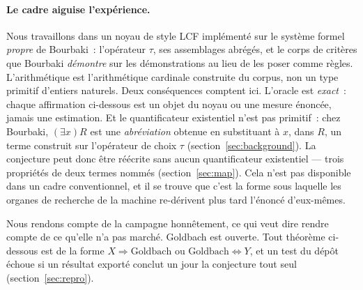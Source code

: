 \documentclass[11pt]{article}
\theoremstyle{remark}\newtheorem{remarque}{Remarque}
\begin{document}
\paragraph{Le cadre aiguise l'expérience.} Nous travaillons dans un noyau de style LCF
implémenté sur le système formel \emph{propre} de Bourbaki~: l'opérateur $\tau$, ses
assemblages abrégés, et le corps de critères que Bourbaki \emph{démontre} sur les
démonstrations au lieu de les poser comme règles. L'arithmétique est l'arithmétique
cardinale construite du corpus, non un type primitif d'entiers naturels. Deux
conséquences comptent ici. L'oracle est \emph{exact}~: chaque affirmation ci-dessous est
un objet du noyau ou une mesure énoncée, jamais une estimation. Et le quantificateur
existentiel n'est pas primitif~: chez Bourbaki, $(\exists x)R$ est une \emph{abréviation}
obtenue en substituant à $x$, dans $R$, un terme construit sur l'opérateur de choix
$\tau$ (section~\ref{sec:background}). La conjecture peut donc être réécrite sans aucun
quantificateur existentiel --- trois propriétés de deux termes nommés
(section~\ref{sec:map}). Cela n'est pas disponible dans un cadre conventionnel, et il se
trouve que c'est la forme sous laquelle les organes de recherche de la machine
re-dérivent plus tard l'énoncé d'eux-mêmes.

Nous rendons compte de la campagne honnêtement, ce qui veut dire rendre compte de ce
qu'elle n'a pas marché. Goldbach est ouverte. Tout théorème ci-dessous est de la forme
$X \Rightarrow \mathrm{Goldbach}$ ou $\mathrm{Goldbach} \Leftrightarrow Y$, et un test du
dépôt échoue si un résultat exporté conclut un jour la conjecture tout seul
(section~\ref{sec:repro}).
\end{document}
